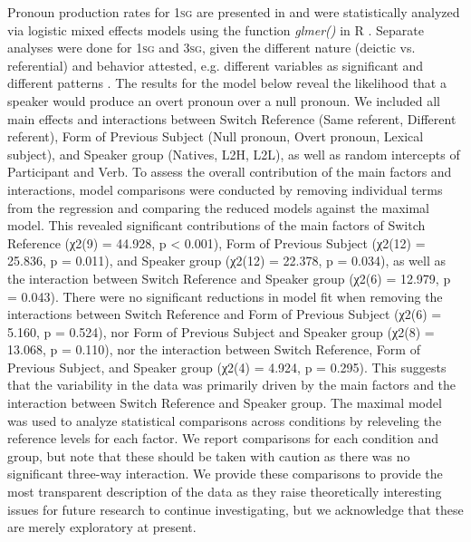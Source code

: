\documentclass[output=paper,colorlinks,citecolor=brown,draftmode]{langscibook}
\begin{document}
Pronoun production rates for 1\textsc{sg} are presented in  and were statistically analyzed via logistic mixed effects models using the function \emph{glmer()} in R \citep{RCoreTeam2017}. Separate analyses were done for 1\textsc{sg} and 3\textsc{sg}, given the different nature (deictic vs. referential) and behavior attested, e.g. different variables as significant \citep{PradaPérezSoler2020} and different patterns \citep{TravisCacoullos2018}. The results for the model below reveal the likelihood that a speaker would produce an overt pronoun over a null pronoun. We included all main effects and interactions between Switch Reference (Same referent, Different referent), Form of Previous Subject (Null pronoun, Overt pronoun, Lexical subject), and Speaker group (Natives, L2H, L2L), as well as random intercepts of Participant and Verb. To assess the overall contribution of the main factors and interactions, model comparisons were conducted by removing individual terms from the regression and comparing the reduced models against the maximal model. This revealed significant contributions of the main factors of Switch Reference (χ2(9) = 44.928, p < 0.001), Form of Previous Subject (χ2(12) = 25.836, p = 0.011), and Speaker group (χ2(12) = 22.378, p = 0.034), as well as the interaction between Switch Reference and Speaker group (χ2(6) = 12.979, p = 0.043). There were no significant reductions in model fit when removing the interactions between Switch Reference and Form of Previous Subject (χ2(6) = 5.160, p = 0.524), nor Form of Previous Subject and Speaker group (χ2(8) = 13.068, p = 0.110), nor the interaction between Switch Reference, Form of Previous Subject, and Speaker group (χ2(4) = 4.924, p = 0.295). This suggests that the variability in the data was primarily driven by the main factors and the interaction between Switch Reference and Speaker group. The maximal model was used to analyze statistical comparisons across conditions by releveling the reference levels for each factor. We report comparisons for each condition and group, but note that these should be taken with caution as there was no significant three-way interaction. We provide these comparisons to provide the most transparent description of the data as they raise theoretically interesting issues for future research to continue investigating, but we acknowledge that these are merely exploratory at present.
\end{document}
